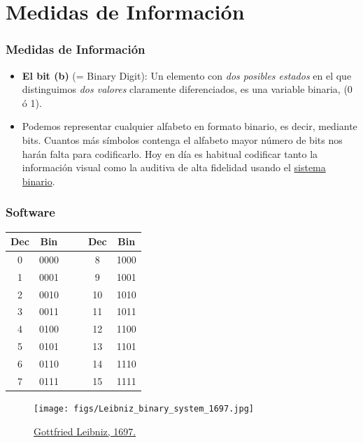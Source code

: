\documentclass[aspectratio=169]{beamer}
\begin{document}
\section{Medidas de Información}
\begin{frame}[fragile]\frametitle{Medidas de Información}
\begin{itemize}
\item \textbf{El bit (b)} (= Binary Digit): Un elemento con \emph{dos posibles estados} en el que distinguimos \emph{dos valores} claramente diferenciados, es una variable binaria, (0 ó 1).
\item Podemos representar cualquier alfabeto en formato binario, es decir, mediante bits. Cuantos más símbolos contenga el alfabeto mayor número de bits nos harán falta para codificarlo. Hoy en día es habitual codificar tanto la información visual como la auditiva de alta fidelidad usando el \href{https://es.wikipedia.org/wiki/Sistema_binario}{sistema binario}.
\end{itemize}
\end{frame}


\begin{frame}[fragile]\frametitle{Software}

\begin{minipage}{5cm}
\begin{tabular}{c|c| c c |c|c}
Dec& Bin  & & & Dec& Bin\\ \hline
0	& 0000 & & & 8	& 1000 \\
1	& 0001 & & & 9	& 1001 \\
2	& 0010 & & & 10	& 1010 \\
3	& 0011 & & & 11	& 1011 \\
4	& 0100 & & & 12	& 1100 \\
5	& 0101 & & & 13	& 1101 \\
6	& 0110 & & & 14	& 1110 \\
7	& 0111 & & & 15	& 1111
\end{tabular}
\end{minipage}
\hfill
\begin{minipage}{5cm}
\begin{figure}
\texttt{[image: figs/Leibniz\_binary\_system\_1697.jpg]}
\caption{\href{https://es.wikipedia.org/wiki/Gottfried_Leibniz}{Gottfried Leibniz, 1697.}}
\end{figure}
\end{minipage}
\end{frame}
\end{document}
